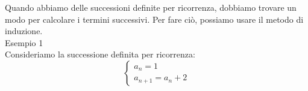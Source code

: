 Quando abbiamo delle successioni definite per ricorrenza, dobbiamo trovare un modo per calcolare i termini successivi. Per fare ciò, possiamo usare il metodo di induzione.\\
Esempio 1\\
Consideriamo la successione definita per ricorrenza:
\[ 
\left\{
\begin{array}{ll}
a_{n} = 1 \\
a_{n+1} = a_{n} + 2
\end{array}
\right.
\]